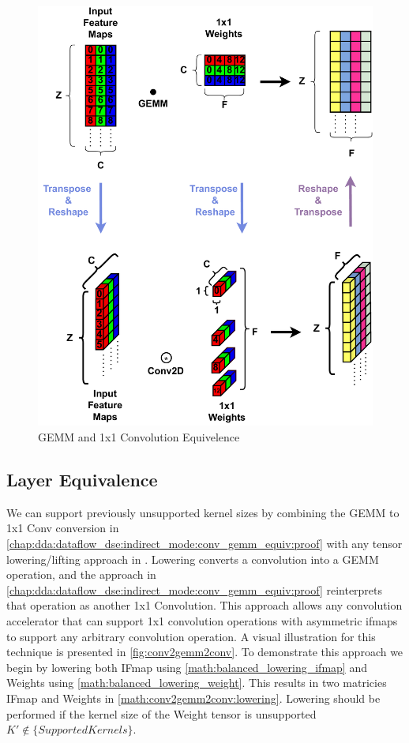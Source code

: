 \begin{figure}[]
    \centering
    \includegraphics[scale=0.5]{fig/GemmTo1x1Conv.pdf}
    \caption{\ac{GEMM} and 1x1 Convolution Equivelence}
    \label{fig:gemmTo1x1Conv}
\end{figure}


\subsection{Layer Equivalence}
\label{chap:dda:dataflow_dse:indirect_mode:layer_equivelence}

We can support previously unsupported kernel sizes by combining the GEMM to 1x1
Conv conversion in
\autoref{chap:dda:dataflow_dse:indirect_mode:conv_gemm_equiv:proof} with any
tensor lowering/lifting approach in \cite{cafe_con_troll}. Lowering converts a
convolution into a GEMM operation, and the approach in
\autoref{chap:dda:dataflow_dse:indirect_mode:conv_gemm_equiv:proof} reinterprets
that operation as another 1x1 Convolution. This approach allows any convolution
accelerator that can support 1x1 convolution operations with asymmetric ifmaps
to support any arbitrary convolution operation. A visual illustration for this
technique is presented in \autoref{fig:conv2gemm2conv}. To demonstrate this
approach we begin by lowering both IFmap using
\autoref{math:balanced_lowering_ifmap} and Weights using
\autoref{math:balanced_lowering_weight}. This results in two matricies IFmap and
Weights in \autoref{math:conv2gemm2conv:lowering}. Lowering should be performed
if the kernel size of the Weight tensor is unsupported $K' \notin
\{SupportedKernels\}$. 

